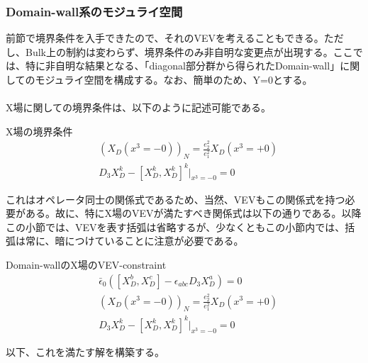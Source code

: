 \documentclass[dvipdfmx,a4paper,10.5pt]{article}
\numberwithin{equation}{section}
\begin{document}
\subsubsection{Domain-wall系のモジュライ空間}
前節で境界条件を入手できたので、それのVEVを考えることもできる。ただし、Bulk上の制約は変わらず、境界条件のみ非自明な変更点が出現する。ここでは、特に非自明な結果となる、「diagonal部分群から得られたDomain-wall」に関してのモジュライ空間を構成する。なお、簡単のため、Y=0とする。\\
\\
X場に関しての境界条件は、以下のように記述可能である。
\begin{resultbox}{X場の境界条件}
    \begin{align*}
        &(X_{D}(x^{3}=-0))_{N}=\frac{e_{2}^{2}}{e_{1}^{2}}X_{D}(x^{3}=+0)\\
        &D_{3}X_{D}^{k}-[X_{D}^{k},X_{D}^{k}]^{k}|_{x^{3}=-0}=0
    \end{align*}
\end{resultbox}
これはオペレータ同士の関係式であるため、当然、VEVもこの関係式を持つ必要がある。故に、特にX場のVEVが満たすべき関係式は以下の通りである。以降この小節では、VEVを表す括弧は省略するが、少なくともこの小節内では、括弧は常に、暗につけていることに注意が必要である。
\begin{resultbox}{Domain-wallのX場のVEV-constraint}
    \begin{align*}
        &\bar{\epsilon}_{0}([X_{D}^{b},X_{D}^{c}]-\epsilon_{abc}D_{3}X_{D}^{a})=0\\
        &(X_{D}(x^{3}=-0))_{N}=\frac{e_{2}^{2}}{e_{1}^{2}}X_{D}(x^{3}=+0)\\
        &D_{3}X_{D}^{k}-[X_{D}^{k},X_{D}^{k}]^{k}|_{x^{3}=-0}=0
    \end{align*}
\end{resultbox}
以下、これを満たす解を構築する。
\end{document}
